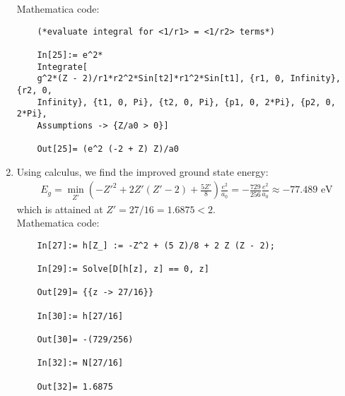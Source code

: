 \documentclass{article}
\theoremstyle{definition}
\newcommand{\ham}{\mathcal{H}}
\newcommand{\f}[2]{\frac{#1}{#2}}
\newcommand{\lp}{\left(}
\newcommand{\rp}{\right)}
\begin{document}
\begin{enumerate}[label=(\alph*)]
	
	Mathematica code:
	\begin{lstlisting}
	(*evaluate integral for <1/r1> = <1/r2> terms*)
	
	In[25]:= e^2*
	Integrate[
	g^2*(Z - 2)/r1*r2^2*Sin[t2]*r1^2*Sin[t1], {r1, 0, Infinity}, {r2, 0,
	Infinity}, {t1, 0, Pi}, {t2, 0, Pi}, {p1, 0, 2*Pi}, {p2, 0, 2*Pi},
	Assumptions -> {Z/a0 > 0}]
	
	Out[25]= (e^2 (-2 + Z) Z)/a0
	\end{lstlisting}
	
	
	\item Using calculus, we find the improved ground state energy:
	\begin{align*}
	E_g = \min_{Z'} \lp -Z'^2 +2Z'(Z'-2) + \f{5 Z'}{8} \rp \f{e^2}{a_0} = -\f{729}{256}\f{e^2}{a_0} \approx \boxed{-77.489 \text{ eV}}
	\end{align*}
	which is attained at $Z' = 27/16 = 1.6875 < 2$.\\
	
	Mathematica code:
	\begin{lstlisting}
	In[27]:= h[Z_] := -Z^2 + (5 Z)/8 + 2 Z (Z - 2);
	
	In[29]:= Solve[D[h[z], z] == 0, z]
	
	Out[29]= {{z -> 27/16}}
	
	In[30]:= h[27/16]
	
	Out[30]= -(729/256)
	
	In[32]:= N[27/16]
	
	Out[32]= 1.6875
	\end{lstlisting}
	
	
\end{enumerate}
\end{document}
